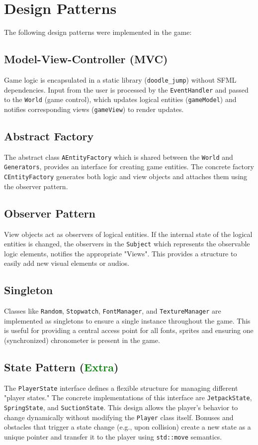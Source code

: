 \documentclass{article}
\begin{document}
\section*{Design Patterns}
The following design patterns were implemented in the game:

\subsection*{Model-View-Controller (MVC)}
Game logic is encapsulated in a static library (\texttt{doodle\_jump}) without SFML dependencies. Input from the user is processed by the \texttt{EventHandler} and passed to the \texttt{World} (game control), which updates logical entities (\texttt{gameModel}) and notifies corresponding views (\texttt{gameView}) to render updates.

\subsection*{Abstract Factory}
The abstract class \texttt{AEntityFactory} which is shared between the \texttt{World} and \texttt{Generators}, provides an interface for creating game entities. The concrete factory \texttt{CEntityFactory} generates both logic and view objects and attaches them using the observer pattern.

\subsection*{Observer Pattern}
View objects act as observers of logical entities. If the internal state of the logical entities is changed, the observers in the \texttt{Subject} which represents the observable logic elements, notifies the appropriate "Views". This provides a structure to easily add new visual elements or audios. 

\subsection*{Singleton}
Classes like \texttt{Random}, \texttt{Stopwatch}, \texttt{FontManager}, and \texttt{TextureManager} are implemented as singletons to ensure a single instance throughout the game. This is useful for providing a central access point for all fonts, sprites and ensuring one (synchronized) chronometer is present in the game. 

\subsection*{State Pattern (\textcolor{green}{Extra})}
The \texttt{PlayerState} interface defines a flexible structure for managing different "player states." The concrete implementations of this interface are \texttt{JetpackState}, \texttt{SpringState}, and \texttt{SuctionState}. This design allows the player's behavior to change dynamically without modifying the \texttt{Player} class itself. Bonuses and obstacles that trigger a state change (e.g., upon collision) create a new state as a unique pointer and transfer it to the player using \texttt{std::move} semantics.
\end{document}
